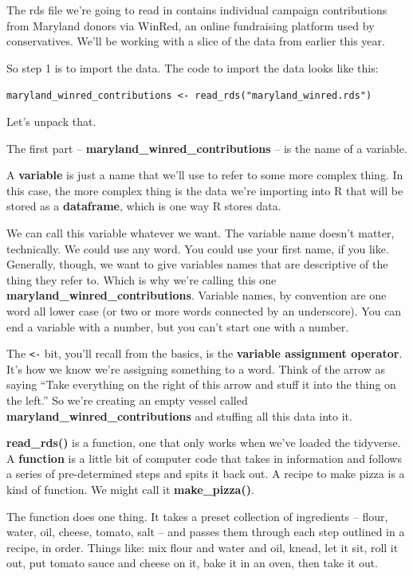 \documentclass[
  letterpaper,
  DIV=11,
  numbers=noendperiod]{scrreprt}
\begin{document}
The rds file we're going to read in contains individual campaign
contributions from Maryland donors via WinRed, an online fundraising
platform used by conservatives. We'll be working with a slice of the
data from earlier this year.

So step 1 is to import the data. The code to import the data looks like
this:

\texttt{maryland\_winred\_contributions\ \textless{}-\ read\_rds("maryland\_winred.rds")}

Let's unpack that.

The first part -- \textbf{maryland\_winred\_contributions} -- is the
name of a variable.

A \textbf{variable} is just a name that we'll use to refer to some more
complex thing. In this case, the more complex thing is the data we're
importing into R that will be stored as a \textbf{dataframe}, which is
one way R stores data.

We can call this variable whatever we want. The variable name doesn't
matter, technically. We could use any word. You could use your first
name, if you like. Generally, though, we want to give variables names
that are descriptive of the thing they refer to. Which is why we're
calling this one \textbf{maryland\_winred\_contributions}. Variable
names, by convention are one word all lower case (or two or more words
connected by an underscore). You can end a variable with a number, but
you can't start one with a number.

The \texttt{\textless{}-} bit, you'll recall from the basics, is the
\textbf{variable assignment operator}. It's how we know we're assigning
something to a word. Think of the arrow as saying ``Take everything on
the right of this arrow and stuff it into the thing on the left.'' So
we're creating an empty vessel called
\textbf{maryland\_winred\_contributions} and stuffing all this data into
it.

\textbf{read\_rds()} is a function, one that only works when we've
loaded the tidyverse. A \textbf{function} is a little bit of computer
code that takes in information and follows a series of pre-determined
steps and spits it back out. A recipe to make pizza is a kind of
function. We might call it \textbf{make\_pizza()}.

The function does one thing. It takes a preset collection of ingredients
-- flour, water, oil, cheese, tomato, salt -- and passes them through
each step outlined in a recipe, in order. Things like: mix flour and
water and oil, knead, let it sit, roll it out, put tomato sauce and
cheese on it, bake it in an oven, then take it out.
\end{document}

